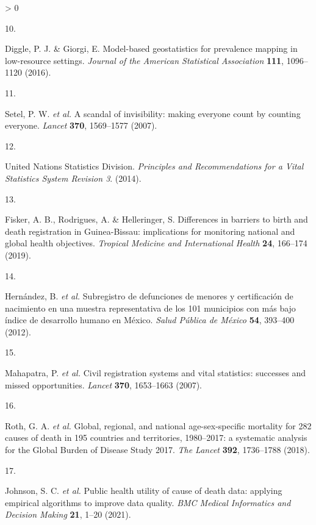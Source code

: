 \documentclass[
]{article}
\newlength{\cslhangindent}
\newlength{\csllabelwidth}
\newenvironment{CSLReferences}[2] %
 {%
  \setlength{\parindent}{0pt}
  \ifodd #1 \everypar{\setlength{\hangindent}{\cslhangindent}}\ignorespaces\fi
  \ifnum #2 > 0
  \setlength{\parskip}{#2\baselineskip}
  \fi
 }%
 {}
\newcommand{\CSLLeftMargin}[1]{\parbox[t]{\csllabelwidth}{#1}}
\newcommand{\CSLRightInline}[1]{\parbox[t]{\linewidth - \csllabelwidth}{#1}\break}
\begin{document}
\begin{CSLReferences}{0}{0}
\leavevmode\hypertarget{ref-Diggle2016}{}%
\CSLLeftMargin{10. }
\CSLRightInline{Diggle, P. J. \& Giorgi, E. {Model-based geostatistics for prevalence mapping in low-resource settings}. \emph{Journal of the American Statistical Association} \textbf{111}, 1096--1120 (2016).}

\leavevmode\hypertarget{ref-Setel2007}{}%
\CSLLeftMargin{11. }
\CSLRightInline{Setel, P. W. \emph{et al.} {A scandal of invisibility: making everyone count by counting everyone}. \emph{Lancet} \textbf{370}, 1569--1577 (2007).}

\leavevmode\hypertarget{ref-UnitedNationsStatisticsDivision2014}{}%
\CSLLeftMargin{12. }
\CSLRightInline{United Nations Statistics Division. \emph{{Principles and Recommendations for a Vital Statistics System Revision 3}}. (2014).}

\leavevmode\hypertarget{ref-Fisker2019}{}%
\CSLLeftMargin{13. }
\CSLRightInline{Fisker, A. B., Rodrigues, A. \& Helleringer, S. {Differences in barriers to birth and death registration in Guinea-Bissau: implications for monitoring national and global health objectives}. \emph{Tropical Medicine and International Health} \textbf{24}, 166--174 (2019).}

\leavevmode\hypertarget{ref-Hernandez2012}{}%
\CSLLeftMargin{14. }
\CSLRightInline{Hernández, B. \emph{et al.} {Subregistro de defunciones de menores y certificaci{ó}n de nacimiento en una muestra representativa de los 101 municipios con m{á}s bajo {í}ndice de desarrollo humano en M{é}xico}. \emph{Salud P{ú}blica de M{é}xico} \textbf{54}, 393--400 (2012).}

\leavevmode\hypertarget{ref-Mahapatra2007}{}%
\CSLLeftMargin{15. }
\CSLRightInline{Mahapatra, P. \emph{et al.} {Civil registration systems and vital statistics: successes and missed opportunities}. \emph{Lancet} \textbf{370}, 1653--1663 (2007).}

\leavevmode\hypertarget{ref-Roth2018}{}%
\CSLLeftMargin{16. }
\CSLRightInline{Roth, G. A. \emph{et al.} {Global, regional, and national age-sex-specific mortality for 282 causes of death in 195 countries and territories, 1980--2017: a systematic analysis for the Global Burden of Disease Study 2017}. \emph{The Lancet} \textbf{392}, 1736--1788 (2018).}

\leavevmode\hypertarget{ref-Johnson2021}{}%
\CSLLeftMargin{17. }
\CSLRightInline{Johnson, S. C. \emph{et al.} {Public health utility of cause of death data: applying empirical algorithms to improve data quality}. \emph{BMC Medical Informatics and Decision Making} \textbf{21}, 1--20 (2021).}


\end{CSLReferences}
\end{document}
